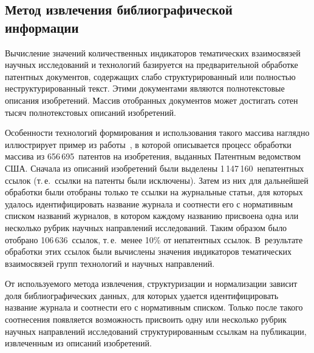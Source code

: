 \begin{multicols}{2}
\section{Метод извлечения библиографической информации}
      
      Вычисление значений количественных индикаторов тематических взаимосвязей 
научных исследований и технологий базируется на предварительной обработке патентных 
документов, содержащих слабо структурированный или полностью неструктурированный 
текст. Этими документами являются полнотекстовые описания изобретений. Массив 
отобранных документов может достигать сотен тысяч полнотекстовых описаний изобретений.
      
      Особенности технологий формирования и использования такого массива наглядно 
иллюстрирует пример из работы~\cite{20-zac}, в которой описывается процесс обработки 
массива из 656\,695~патентов на изобретения, выданных Патентным ведомством США. 
Сначала из описаний изобретений были выделены 1\,147\,160~непатентных ссылок (т.\,е.\ 
ссылки на патенты были исключены). Затем из них для дальнейшей обработки были отобраны 
только те ссылки на журнальные статьи, для которых удалось идентифицировать название 
журнала и соотнести его с нормативным списком названий журналов, в котором каждому 
названию присвоена одна или несколько рубрик научных направлений исследований. Таким 
образом было отобрано 106\,636~ссылок, т.\,е.\ менее 10\% от непатентных ссылок. 
В~результате обработки этих ссылок были вычислены значения индикаторов тематических 
взаимосвязей групп технологий и научных направлений.
      
      От используемого метода извлечения, структуризации и нормализации 
       зависит доля библиографических данных, для которых удается 
идентифицировать название журнала и соотнести его с норматив\-ным списком. Только после 
такого соотнесения появляется возможность присвоить одну или несколько рубрик научных 
направлений исследований структурированным ссылкам на публикации, извлеченным из 
описаний изобретений.

\begin{figure*}[b] %
         \vspace*{1pt}
 \begin{center}
 \mbox{%
 \epsfxsize=112.636mm
 }
 \end{center}
 \vspace*{-6pt}
      \end{figure*}
      

\end{multicols}
